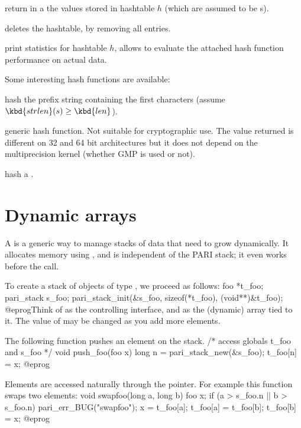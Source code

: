  return in a 
the values stored in hashtable $h$ (which are assumed to be s).

 deletes the hashtable, by removing all
entries.

 print statistics for hashtable $h$, allows
to evaluate the attached hash function performance on actual data.

Some interesting hash functions are available:


 hash the prefix string
containing the first  characters (assume $\kbd{strlen}(s) \geq
\kbd{len}$).

 generic hash function. Not suitable for
cryptographic use. The value returned is different on 32 and 64 bit
architectures but it does not depend on the multiprecision kernel (whether
GMP is used or not).

 hash a .

\section{Dynamic arrays}

A  is a generic way to manage stacks of data that need
to grow dynamically. It allocates memory using , and is
independent of the PARI stack; it even works before the  call.


To create a stack of objects of type , we proceed as follows:
\bprog
foo *t_foo;
pari_stack s_foo;
pari_stack_init(&s_foo, sizeof(*t_foo), (void**)&t_foo);
@eprog\noindent Think of  as the controlling interface, and
 as the (dynamic) array tied to it. The value of 
may be changed as you add more elements.

The following function pushes an element on the stack.
\bprog
/* access globals t_foo and s_foo */
void push_foo(foo x)
{
  long n = pari_stack_new(&s_foo);
  t_foo[n] = x;
}
@eprog


Elements are accessed naturally through the  pointer.
For example this function swaps two elements:
\bprog
void swapfoo(long a, long b)
{
  foo x;
  if (a > s_foo.n || b > s_foo.n) pari_err_BUG("swapfoo");
  x        = t_foo[a];
  t_foo[a] = t_foo[b];
  t_foo[b] = x;
}
@eprog

